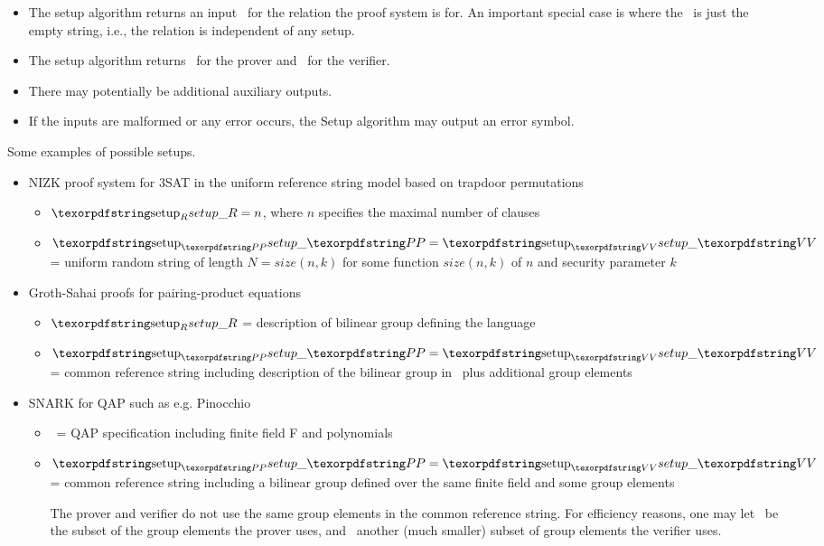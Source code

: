\begin{itemize}
\item The setup algorithm returns an input \setR\ for the relation the proof system is for. An important special case is where the \setR\ is just the empty string, i.e., the relation is independent of any setup.
\item The setup algorithm returns \setP\ for the prover and \setV\ for the verifier.
\item There may potentially be additional auxiliary outputs.
\item If the inputs are malformed or any error occurs, the Setup algorithm may output an error symbol.
\end{itemize}


Some examples of possible setups.
\begin{itemize}

\item NIZK proof system for 3SAT in the uniform reference string model based on trapdoor permutations
		\begin{itemize}
		\item $\setR = n$, where $n$ specifies the maximal number of clauses
		\item $\setP = \setV$ = uniform random string of length $N = size(n,k)$ for some function $size(n,k)$ of $n$ and security parameter $k$
		\end{itemize}

\item Groth-Sahai proofs for pairing-product equations
	\begin{itemize}
	\item $\setR$ = description of bilinear group defining the language
	\item $\setP = \setV$ = common reference string including description of the bilinear group in \setR\ plus additional group elements
	\end{itemize}

\item SNARK for QAP such as e.g. Pinocchio
	\begin{itemize}
	\item \setR\ = QAP specification including finite field F and polynomials
	\item $\setP = \setV$ = common reference string including a bilinear group defined over the same finite field and some group elements

The prover and verifier do not use the same group elements in the common reference string. For efficiency reasons, one may let \setP\ be the subset of the group elements the prover uses, and \setV\ another (much smaller) subset of group elements the verifier uses.\loosen
	\end{itemize}


\end{itemize}
